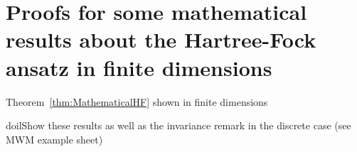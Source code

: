 \chapter{Proofs for some mathematical results about the Hartree-Fock ansatz in finite dimensions}
\label{apx:HFTheoremFinite}

Theorem~\vref{thm:MathematicalHF} shown in finite dimensions

\to doil{Show these results as well as the invariance remark
in the discrete case (see MWM example sheet)}
